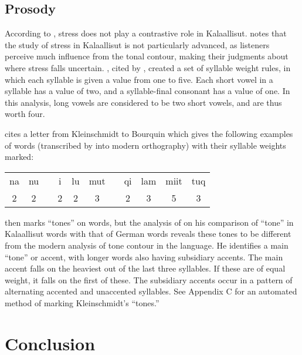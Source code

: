 \documentclass[12pt]{article}
\begin{document}
	\subsection{Prosody}

	According to \citet{grammar}, stress does not play a contrastive role in Kalaallisut. \citet{rischel} notes that the study of stress in Kalaallisut is not particularly advanced, as listeners perceive much influence from the tonal contour, making their judgments about where stress falls uncertain. \citet{kleinschmidt}, cited by \citet{rischel}, created a set of syllable weight rules, in which each syllable is given a value from one to five. Each short vowel in a syllable has a value of two, and a syllable-final consonant has a value of one. In this analysis, long vowels are considered to be two short vowels, and are thus worth four. \par

	\citet{kleinletter} cites a letter from Kleinschmidt to Bourquin which gives the following examples of words (transcribed by \citet{rischel} into modern orthography) with their syllable weights marked:

	\begin{exe}
	\item
	\begin{tabular}{ccccccccccc}
	na & nu & & i & lu & mut & & qi & lam & miit & tuq \\
	2 & 2 & & 2 & 2 & 3 & & 2 & 3 & 5 & 3 \\
	\end{tabular}
	\end{exe}

	\citet{kleinschmidt} then marks ``tones'' on words, but the analysis of \citet{rischel} on his comparison of ``tone'' in Kalaallisut words with that of German words reveals these tones to be different from the modern analysis of tone contour in the language. He identifies a main ``tone'' or accent, with longer words also having subsidiary accents. The main accent falls on the heaviest out of the last three syllables. If these are of equal weight, it falls on the first of these. The subsidiary accents occur in a pattern of alternating accented and unaccented syllables. See Appendix C for an automated method of marking Kleinschmidt's ``tones.'' \par

\section{Conclusion}
\end{document}
